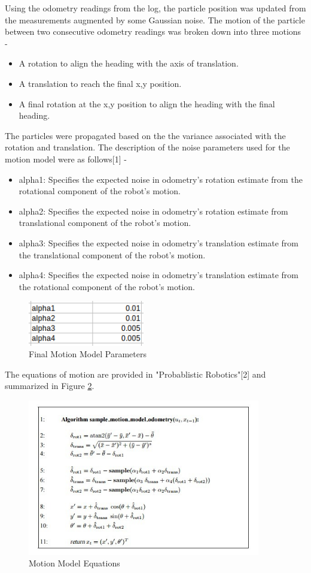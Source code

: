 \documentclass{article}
\begin{document}
Using the odometry readings from the log, the particle position was updated from the measurements augmented by some Gaussian noise. The motion of the particle between two consecutive odometry readings was broken down into three motions - 
\begin{itemize}
\item A rotation to align the heading with the axis of translation.
\item A translation to reach the final x,y position.
\item A final rotation at the x,y position to align the heading with the final heading.
\end{itemize}

The particles were propagated based on the the variance associated with the rotation and translation. The description of the noise parameters used for the motion model were as follows[1] - 
\begin{itemize}
\item alpha1: Specifies the expected noise in odometry's rotation estimate from the rotational component of the robot's motion. 
\item alpha2: Specifies the expected noise in odometry's rotation estimate from translational component of the robot's motion. 
\item alpha3: Specifies the expected noise in odometry's translation estimate from the translational component of the robot's motion. 
\item alpha4: Specifies the expected noise in odometry's translation estimate from the rotational component of the robot's motion. 
\end{itemize}

\begin{figure}[!h]
    \centering
    \includegraphics[width=2.0in]{media/motion_model_parameters.png}
    \caption{Final Motion Model Parameters}
\label{fig:4}
\end{figure}

The equations of motion are provided in "Probablistic Robotics"[2] and summarized in Figure \ref{fig:4.0}. 
\begin{figure}[!h]
    \centering
    \includegraphics[width=4.0in]{media/motion_model_equations.jpg}
    \caption{Motion Model Equations}
\label{fig:4.0}
\end{figure}
\end{document}
